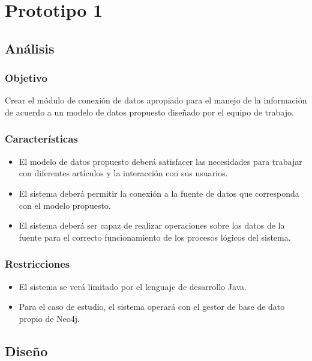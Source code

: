 \chapter{Prototipo 1}
  \section{Análisis}
    \subsection{Objetivo}
      Crear el módulo de conexión de datos apropiado para el manejo de la información de acuerdo a un modelo de datos propuesto diseñado por el equipo de trabajo.

    \subsection{Características}
      \begin{itemize}
        \item El modelo de datos propuesto deberá satisfacer las necesidades para trabajar con diferentes artículos y la interacción con sus usuarios.
        \item El sistema deberá permitir la conexión a la fuente de datos que corresponda con el modelo propuesto.
        \item El sistema deberá ser capaz de realizar operaciones sobre los datos de la fuente para el correcto funcionamiento de los procesos lógicos del sistema.
      \end{itemize}

    \subsection{Restricciones}
      \begin{itemize}
        \item El sistema se verá limitado por el lenguaje de desarrollo Java.
        \item Para el caso de estudio, el sistema operará con el gestor de base de dato propio de Neo4j. 
      \end{itemize}

  \section{Diseño}

